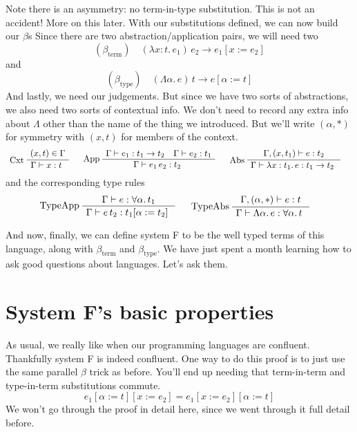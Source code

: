 \documentclass[12pt]{article}
\newenvironment{bprooftree}
  {\leavevmode\hbox\bgroup}
  {\DisplayProof\egroup}
\begin{document}
Note there is an asymmetry: no term-in-type substitution.
This is not an accident! More on this later.
With our substitutions defined, we can now build our $\beta$s
Since there are two abstraction/application pairs, we will need two 
\[
  (\beta_{\text{term}})\quad (\lambda x:t.\, e_1)\, e_2 \rightarrow e_1[x:= e_2]
\]
and
\[
  (\beta_{\text{type}})\quad (\Lambda \alpha.\, e)\, t \rightarrow e[\alpha:= t]
\]
And lastly, we need our judgements. 
But since we have two sorts of abstractions, we also need two sorts of contextual info.
We don't need to record any extra info about $\Lambda$ other than the name of the thing we introduced. 
But we'll write $(\alpha, *)$ for symmetry with $(x,t)$ for members of the context.
\[
\begin{bprooftree}
\AxiomC{$(x,t) \in \Gamma$}
\LeftLabel{Cxt}
\UnaryInfC{$\Gamma \vdash x : t$ }
\end{bprooftree}\quad
\begin{bprooftree}
\AxiomC{$\Gamma \vdash e_1 : t_1 \rightarrow t_2 \quad \Gamma \vdash e_2 : t_1$}
\LeftLabel{App}
\UnaryInfC{$\Gamma \vdash e_1\, e_2 : t_2$ }
\end{bprooftree}\quad
\begin{bprooftree}
\AxiomC{$\Gamma, (x,t_1) \vdash e : t_2$}
\LeftLabel{Abs}
\UnaryInfC{$\Gamma \vdash \lambda x:t_1.\, e : t_1 \rightarrow t_2$ }
\end{bprooftree}\quad
\]
and the corresponding type rules
\[
\begin{bprooftree}
\AxiomC{$\Gamma \vdash e : \forall \alpha.\, t_1 $}
\LeftLabel{TypeApp}
\UnaryInfC{$\Gamma \vdash e\, t_2 : t_1[\alpha:=t_2]$ }
\end{bprooftree}\quad
\begin{bprooftree}
\AxiomC{$\Gamma, (\alpha,*) \vdash e : t$}
\LeftLabel{TypeAbs}
\UnaryInfC{$\Gamma \vdash \Lambda \alpha.\, e : \forall \alpha.\, t$ }
\end{bprooftree}\quad
\]

And now, finally, we can define system F to be the well typed terms of this language, along with $\beta_{\text{term}}$ and $\beta_{\text{type}}$.
We have just spent a month learning how to ask good questions about languages.
Let's ask them.
\section{System F's basic properties}
As usual, we really like when our programming languages are confluent.
Thankfully system F is indeed confluent.
One way to do this proof is to just use the same parallel $\beta$ trick as before.
You'll end up needing that term-in-term and type-in-term substitutions commute.
\[
  e_1[\alpha := t] [x := e_2] =  e_1 [x := e_2][\alpha := t] 
\]
We won't go through the proof in detail here, since we went through it full detail before.
\end{document}
